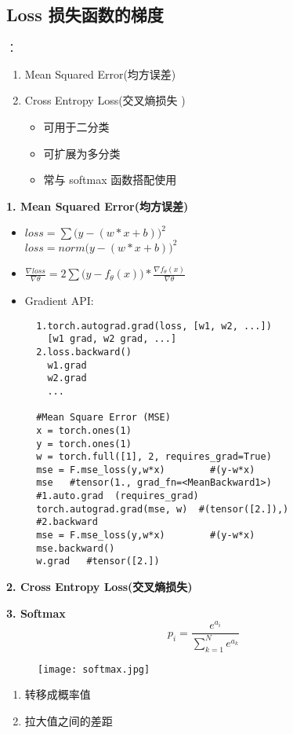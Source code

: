 \subsection{Loss 损失函数的梯度}
：
\begin{enumerate}
  \item Mean Squared Error(均方误差)
  \item Cross Entropy Loss(交叉熵损失 )
  \begin{itemize}
  \item 可用于二分类
  \item 可扩展为多分类
  \item 常与 softmax 函数搭配使用
\end{itemize}
\end{enumerate}




\noindent\textbf{1. Mean Squared Error(均方误差)}
\begin{itemize}
  \item $loss = \sum\big(y-(w*x+b)\big)^2$\\
  $loss = norm\big(y-(w*x+b)\big)^2$
  \item $\frac{\nabla loss}{\nabla \theta} = 2\sum \big(y-f_\theta(x)\big)*\frac{\nabla f_\theta(x)}{\nabla \theta}$
  \item Gradient API:\\
  \begin{lstlisting}
  1.torch.autograd.grad(loss, [w1, w2, ...])
    [w1 grad, w2 grad, ...]
  2.loss.backward()
    w1.grad
    w2.grad
    ...

  #Mean Square Error (MSE)
  x = torch.ones(1)
  y = torch.ones(1)
  w = torch.full([1], 2, requires_grad=True)
  mse = F.mse_loss(y,w*x)        #(y-w*x)
  mse   #tensor(1., grad_fn=<MeanBackward1>)
  #1.auto.grad  (requires_grad)
  torch.autograd.grad(mse, w)  #(tensor([2.]),)
  #2.backward
  mse = F.mse_loss(y,w*x)        #(y-w*x)
  mse.backward()
  w.grad   #tensor([2.])
\end{lstlisting}
\end{itemize}

\noindent\textbf{2. Cross Entropy Loss(交叉熵损失)}

\noindent\textbf{3. Softmax}
$$p_i=\frac{e^{a_i}}{\sum_{k=1}^{N}e^{a_k}}$$
\begin{figure}[!h]
  \centering
  \texttt{[image: softmax.jpg]}
\end{figure}
\begin{enumerate}
  \item 转移成概率值
  \item 拉大值之间的差距
\end{enumerate}

